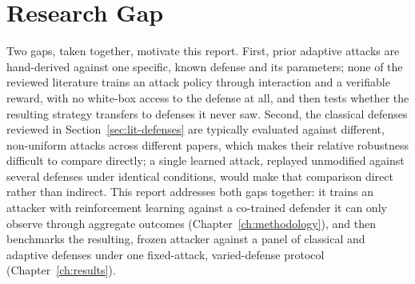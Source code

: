 \section{Research Gap}
\label{sec:lit-gap}

Two gaps, taken together, motivate this report. First, prior adaptive attacks \citep{fang2020,bhagoji2019} are hand-derived against one specific, known defense and its parameters; none of the reviewed literature trains an attack policy through interaction and a verifiable reward, with no white-box access to the defense at all, and then tests whether the resulting strategy transfers to defenses it never saw. Second, the classical defenses reviewed in Section~\ref{sec:lit-defenses} are typically evaluated against different, non-uniform attacks across different papers, which makes their relative robustness difficult to compare directly; a single learned attack, replayed unmodified against several defenses under identical conditions, would make that comparison direct rather than indirect. This report addresses both gaps together: it trains an attacker with reinforcement learning against a co-trained defender it can only observe through aggregate outcomes (Chapter~\ref{ch:methodology}), and then benchmarks the resulting, frozen attacker against a panel of classical and adaptive defenses under one fixed-attack, varied-defense protocol (Chapter~\ref{ch:results}).
